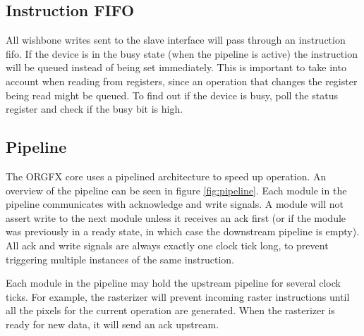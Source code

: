 \documentclass[10pt,a4paper]{article}
\begin{document}
\subsection{Instruction FIFO}
All wishbone writes sent to the slave interface will pass through an instruction fifo. If the device is in the busy state (when the pipeline is active) the instruction will be queued instead of being set immediately. This is important to take into account when reading from registers, since an operation that changes the register being read might be queued. To find out if the device is busy, poll the status register and check if the busy bit is high.

\subsection{Pipeline}
The ORGFX core uses a pipelined architecture to speed up operation. An overview of the pipeline can be seen in figure \ref{fig:pipeline}. Each module in the pipeline communicates with acknowledge and write signals. A module will not assert write to the next module unless it receives an ack first (or if the module was previously in a ready state, in which case the downstream pipeline is empty). All ack and write signals are always exactly one clock tick long, to prevent triggering multiple instances of the same instruction.

Each module in the pipeline may hold the upstream pipeline for several clock ticks. For example, the rasterizer will prevent incoming raster instructions until all the pixels for the current operation are generated. When the rasterizer is ready for new data, it will send an ack upstream.

\end{document}

